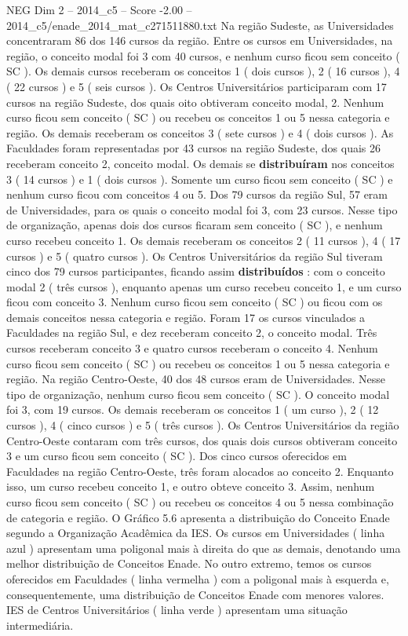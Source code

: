 \begin{textsample}{NEG Dim 2 – 2014\_c5 – Score -2.00 – 2014\_c5/enade\_2014\_mat\_c271511880.txt}
Na região Sudeste, as Universidades concentraram 86 dos 146 cursos da região.
Entre os cursos em Universidades, na região, o conceito modal foi 3 com 40 cursos, e nenhum curso ficou sem conceito ( SC ).
Os demais cursos receberam os conceitos 1 ( dois cursos ), 2 ( 16 cursos ), 4 ( 22 cursos ) e 5 ( seis cursos ).
Os Centros Universitários participaram com 17 cursos na região Sudeste, dos quais oito obtiveram conceito modal, 2.
Nenhum curso ficou sem conceito ( SC ) ou recebeu os conceitos 1 ou 5 nessa categoria e região.
Os demais receberam os conceitos 3 ( sete cursos ) e 4 ( dois cursos ).
As Faculdades foram representadas por 43 cursos na região Sudeste, dos quais 26 receberam conceito 2, conceito modal.
Os demais se \textbf{distribuíram} nos conceitos 3 ( 14 cursos ) e 1 ( dois cursos ).
Somente um curso ficou sem conceito ( SC ) e nenhum curso ficou com conceitos 4 ou 5.
Dos 79 cursos da região Sul, 57 eram de Universidades, para os quais o conceito modal foi 3, com 23 cursos.
Nesse tipo de organização, apenas dois dos cursos ficaram sem conceito ( SC ), e nenhum curso recebeu conceito 1.
Os demais receberam os conceitos 2 ( 11 cursos ), 4 ( 17 cursos ) e 5 ( quatro cursos ).
Os Centros Universitários da região Sul tiveram cinco dos 79 cursos participantes, ficando assim \textbf{distribuídos} : com o conceito modal 2 ( três cursos ), enquanto apenas um curso recebeu conceito 1, e um curso ficou com conceito 3.
Nenhum curso ficou sem conceito ( SC ) ou ficou com os demais conceitos nessa categoria e região.
Foram 17 os cursos vinculados a Faculdades na região Sul, e dez receberam conceito 2, o conceito modal.
Três cursos receberam conceito 3 e quatro cursos receberam o conceito 4.
Nenhum curso ficou sem conceito ( SC ) ou recebeu os conceitos 1 ou 5 nessa categoria e região.
Na região Centro-Oeste, 40 dos 48 cursos eram de Universidades.
Nesse tipo de organização, nenhum curso ficou sem conceito ( SC ).
O conceito modal foi 3, com 19 cursos.
Os demais receberam os conceitos 1 ( um curso ), 2 ( 12 cursos ), 4 ( cinco cursos ) e 5 ( três cursos ).
Os Centros Universitários da região Centro-Oeste contaram com três cursos, dos quais dois cursos obtiveram conceito 3 e um curso ficou sem conceito ( SC ).
Dos cinco cursos oferecidos em Faculdades na região Centro-Oeste, três foram alocados ao conceito 2.
Enquanto isso, um curso recebeu conceito 1, e outro obteve conceito 3.
Assim, nenhum curso ficou sem conceito ( SC ) ou recebeu os conceitos 4 ou 5 nessa combinação de categoria e região.
O Gráfico 5.6 apresenta a distribuição do Conceito Enade segundo a Organização Acadêmica da IES.
Os cursos em Universidades ( linha azul ) apresentam uma poligonal mais à direita do que as demais, denotando uma melhor distribuição de Conceitos Enade.
No outro extremo, temos os cursos oferecidos em Faculdades ( linha vermelha ) com a poligonal mais à esquerda e, consequentemente, uma distribuição de Conceitos Enade com menores valores.
IES de Centros Universitários ( linha verde ) apresentam uma situação intermediária.

\end{textsample}
